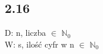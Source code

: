 \documentclass[a4paper,twoside,7pt]{book}
\begin{document}
\subsection*{2.16}

\normalsize
\begin{multicols}{2}
  \begin{flushleft}
D: n, liczba $\in$ $\mathbb{N}_0$\\
W: s, ilość cyfr w n $\in$ $\mathbb{N}_0$

\hspace{0.4cm}
\begin{minipage}{3cm}
\vspace{0.6cm}


\end{minipage}


    \end{flushleft}

    \begin{flushright}
    
    
    \end{flushright}    
\end{multicols}
\newpage
\end{document}

